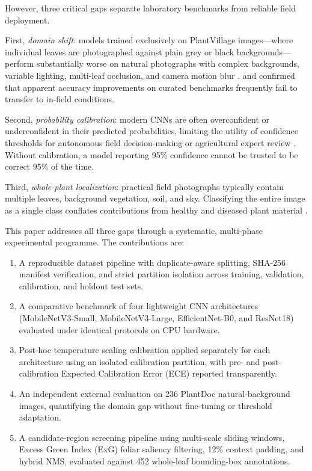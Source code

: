 \documentclass[pdflatex,sn-mathphys-num]{sn-jnl}
\theoremstyle{thmstyleone}%
\theoremstyle{thmstyletwo}%
\theoremstyle{thmstylethree}%
\begin{document}
However, three critical gaps separate laboratory benchmarks from reliable field
deployment.

First, \textit{domain shift}: models trained exclusively on PlantVillage images---where
individual leaves are photographed against plain grey or black backgrounds---perform
substantially worse on natural photographs with complex backgrounds, variable lighting,
multi-leaf occlusion, and camera motion blur \citep{barbedo2016review,singh2020plant,dsouza2023generalization}.
\citet{toda2019deep} and \citet{thapa2020plant} confirmed that apparent accuracy improvements
on curated benchmarks frequently fail to transfer to in-field conditions.

Second, \textit{probability calibration}: modern CNNs are often overconfident or
underconfident in their predicted probabilities, limiting the utility of confidence
thresholds for autonomous field decision-making or agricultural expert review \citep{guo2017calibration,minderer2021calibration}.
Without calibration, a model reporting 95\% confidence cannot be trusted to be correct
95\% of the time.

Third, \textit{whole-plant localization}: practical field photographs typically contain
multiple leaves, background vegetation, soil, and sky. Classifying the entire image as a
single class conflates contributions from healthy and diseased plant material
\citep{barbedo2018factors,ren2015fasterrcnn}.

This paper addresses all three gaps through a systematic, multi-phase experimental
programme. The contributions are:

\begin{enumerate}
  \item A reproducible dataset pipeline with duplicate-aware splitting, SHA-256 manifest
        verification, and strict partition isolation across training, validation,
        calibration, and holdout test sets.
  \item A comparative benchmark of four lightweight CNN architectures (MobileNetV3-Small,
        MobileNetV3-Large, EfficientNet-B0, and ResNet18) evaluated under
        identical protocols on CPU hardware.
  \item Post-hoc temperature scaling calibration applied separately for each architecture
        using an isolated calibration partition, with pre- and post-calibration Expected
        Calibration Error (ECE) reported transparently.
  \item An independent external evaluation on 236 PlantDoc natural-background images,
        quantifying the domain gap without fine-tuning or threshold adaptation.
  \item A candidate-region screening pipeline using multi-scale sliding windows, Excess
        Green Index (ExG) foliar saliency filtering, 12\% context padding, and hybrid
        NMS, evaluated against 452 whole-leaf bounding-box annotations.
\end{enumerate}
\end{document}
